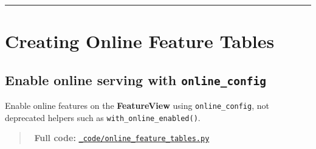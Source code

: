 \documentclass[
  letterpaper,
  DIV=11,
  numbers=noendperiod]{scrreprt}
\begin{document}
\begin{center}\rule{0.5\linewidth}{0.5pt}\end{center}

\hypertarget{creating-online-feature-tables}{%
\section{Creating Online Feature
Tables}\label{creating-online-feature-tables}}

\hypertarget{enable-online-serving-with-online_config}{%
\subsection{\texorpdfstring{Enable online serving with
\texttt{online\_config}}{Enable online serving with online\_config}}\label{enable-online-serving-with-online_config}}

Enable online features on the \textbf{FeatureView} using
\texttt{online\_config}, not deprecated helpers such as
\texttt{with\_online\_enabled()}.

\begin{quote}
📁 \textbf{Full code:}
\href{_code/online_feature_tables.py}{\texttt{\_code/online\_feature\_tables.py}}
\end{quote}
\end{document}
